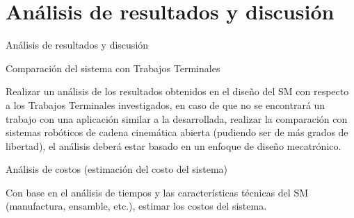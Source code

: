 \section{An\'alisis de resultados y discusi\'on}
\label{Analisis_resultados_discusion}

An\'alisis de resultados y discusi\'on
\par







Comparación del sistema con Trabajos Terminales

Realizar un análisis de los resultados obtenidos en el diseño del SM con respecto a los Trabajos Terminales investigados, en caso de que no se encontrará un trabajo con una aplicación similar a la desarrollada, realizar la comparación con sistemas robóticos de cadena cinemática abierta (pudiendo ser de más grados de libertad), el análisis deberá estar basado en un enfoque de diseño mecatrónico.


Análisis de costos (estimación del costo del sistema)

Con base en el análisis de tiempos y las características técnicas del SM (manufactura, ensamble, etc.), estimar los costos  del sistema.



